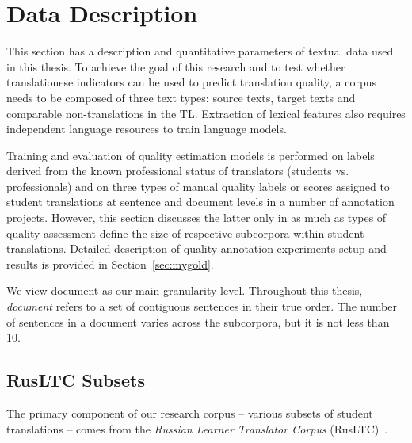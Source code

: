 \section{\label{sec:data}Data Description}
This section has a description and quantitative parameters of textual data used in this thesis. 
To achieve the goal of this research and to test whether translationese indicators can be used to predict translation quality, a corpus needs to be composed of three text types: source texts, target texts and comparable non-translations in the TL. Extraction of lexical features also requires independent language resources to train language models. 

Training and evaluation of quality estimation models is performed on labels derived from the known professional status of translators (students vs. professionals) and on three types of manual quality labels or scores assigned to student translations at sentence and document levels in a number of annotation projects. However, this section discusses the latter only in as much as types of quality assessment define the size of respective subcorpora within student translations. Detailed description of quality annotation experiments setup and results is provided in Section~\ref{sec:mygold}.

We view document as our main granularity level. Throughout this thesis, \textit{document} refers to a set of contiguous sentences in their true order. The number of sentences in a document varies across the subcorpora, but it is not less than 10.

\subsection{\label{ssec:subsets}RusLTC Subsets}
The primary component of our research corpus -- various subsets of student translations -- comes from the \textit{Russian Learner Translator Corpus} (RusLTC)~\cite{Kutuzov2014rltc}.

